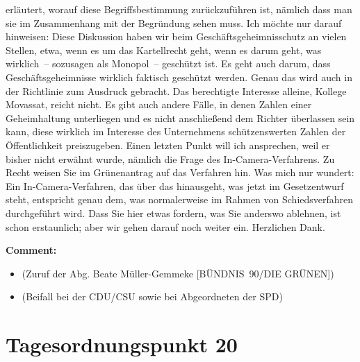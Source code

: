 \documentclass{article}
\begin{document}
erläutert, worauf diese Begriffsbestimmung zurückzuführen ist, nämlich dass man sie im Zusammenhang mit der Begründung sehen muss.  Ich möchte nur darauf hinweisen: Diese Diskussion haben wir beim Geschäftsgeheimnisschutz an vielen Stellen, etwa, wenn es um das Kartellrecht geht, wenn es darum geht, was wirklich – sozusagen als Monopol – geschützt ist. Es geht auch darum, dass Geschäftsgeheimnisse wirklich faktisch geschützt werden. Genau das wird auch in der Richtlinie zum Ausdruck gebracht. Das berechtigte Interesse alleine, Kollege Movassat, reicht nicht. Es gibt auch andere Fälle, in denen Zahlen einer Geheimhaltung unterliegen und es nicht anschließend dem Richter überlassen sein kann, diese wirklich im Interesse des Unternehmens schützenswerten Zahlen der Öffentlichkeit preiszugeben. Einen letzten Punkt will ich ansprechen, weil er bisher nicht erwähnt wurde, nämlich die Frage des In-Camera-Verfahrens. Zu Recht weisen Sie im Grünenantrag auf das Verfahren hin. Was mich nur wundert: Ein In-Camera-Verfahren, das über das hinausgeht, was jetzt im Gesetzentwurf steht, entspricht genau dem, was normalerweise im Rahmen von Schiedsverfahren durchgeführt wird. Dass Sie hier etwas fordern, was Sie anderswo ablehnen, ist schon erstaunlich; aber wir gehen darauf noch weiter ein. Herzlichen Dank. 

\noindent\textbf{Comment:}
\begin{itemize}
    \setlength\itemsep{-3pt}
    \item (Zuruf der Abg. Beate Müller-Gemmeke [BÜNDNIS 90/DIE GRÜNEN])
    \setlength\itemsep{-3pt}
    \item (Beifall bei der CDU/CSU sowie bei Abgeordneten der SPD)
\end{itemize}
\section{Tagesordnungspunkt 20}
\end{document}
